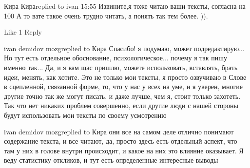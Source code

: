 
 
 
 
 

Кира Кираreplied to ivan
15:55
Извините,я тоже читаю ваши тексты, согласна на 100 %
А то вате такое очень трудно читать, а понять так тем более. )).

    Like 1
    Reply

ivan demidov mozgreplied to Кира
Спасибо! я подумаю, может подредактирую... Но тут есть отдельное обоснование, психологическое... почему я так пишу именно так... Да, и я вам щас пришлю, можете использовать, вставлять, брать идеи, менять, как хотите. Это не только мои тексты, я просто озвучиваю в Слове в сцепленной, связанной форме, то, что у нас у всех на уме, и я уверен, многие другие точно так же могут писать, и даже лучше, чем я, стоит только захотеть. Так что нет никаких проблем совершенно, если другие люди с нашей стороны будут использовать мои тексты по своему усмотрению

ivan demidov mozgreplied to Кира
они все на самом деле отлично понимают содержание текста, и все читают, да, просто здесь есть отдельный аспект, что там у них в голове внутри происходит, и какое на них это влияние оказывает. Я веду статистику откликов, и тут есть определенные интересные выводы
